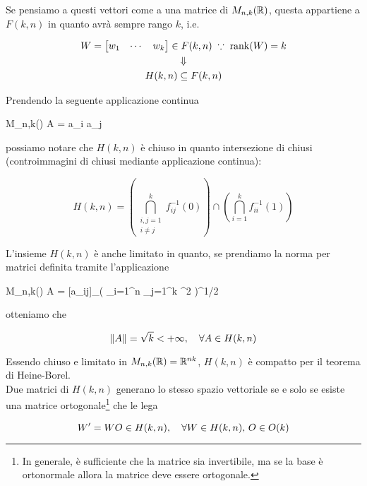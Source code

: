 {Se pensiamo a questi vettori come a una matrice di $ M_{n,k}(\mathbb{R}) $, questa appartiene a $ F(k,n) $ in quanto avrà sempre rango $ k $, i.e.

\begin{gather}
	W = \bmqty{ w_{1} & \cdots & w_{k} } \in F(k,n) %
	\; \because \; %
	\rank(W) = k \nonumber \\
	\Downarrow \\
	H(k,n) \subseteq F(k,n) \nonumber
\end{gather}

Prendendo la seguente applicazione continua

	{M_{n,k}(\R)}{\R}
	{A = }{a_{i} \cdot a_{j}}

possiamo notare che $ H(k,n) $ è chiuso in quanto intersezione di chiusi (controimmagini di chiusi mediante applicazione continua):

\begin{equation}
	H(k,n) = \left( \bigcap_{\substack{ i,j = 1 \\ i \neq j }}^{k} f_{ij}^{-1}(0) \right) \cap \left( \bigcap_{i = 1}^{k} f_{ii}^{-1}(1) \right)
\end{equation}

L'insieme $ H(k,n) $ è anche limitato in quanto, se prendiamo la norma per matrici definita tramite l'applicazione

\map{\norm{}}
	{M_{n,k}(\R)}{\R}
	{A = [a_{ij}]_{}}{\left( \sum_{i=1}^{n} \sum_{j=1}^{k} ^{2} \right)^{1/2}}

otteniamo che

\begin{equation}
	\norm{A} = \sqrt{k} < + \infty \qcomma \forall A \in H(k,n)
\end{equation}

Essendo chiuso e limitato in $ M_{n,k}(\mathbb{R}) = \mathbb{R}^{nk} $, $ H(k,n) $ è compatto per il teorema di Heine-Borel. \\
Due matrici di $ H(k,n) $ generano lo stesso spazio vettoriale se e solo se esiste una matrice ortogonale\footnote{%
	In generale, è sufficiente che la matrice sia invertibile, ma se la base è ortonormale allora la matrice deve essere ortogonale.%
} che le lega

\begin{equation}
	W' = W O \in H(k,n) \qcomma \forall W \in H(k,n), \, O \in O(k)
\end{equation}

}
